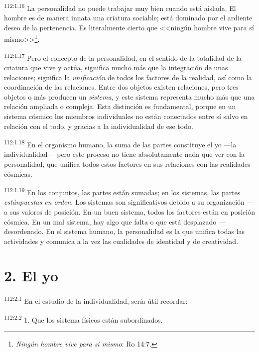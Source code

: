 \documentclass[twoside, 11pt]{book}
\begin{document}
\par
\textsuperscript{112:1.16} La personalidad no puede trabajar muy bien cuando está aislada. El hombre es de manera innata una criatura sociable; está dominado por el ardiente deseo de la pertenencia. Es literalmente cierto que <<ningún hombre vive para sí mismo>>\footnote{\textit{Ningún hombre vive para sí mismo}: Ro 14:7.}.

\par
\textsuperscript{112:1.17} Pero el concepto de la personalidad, en el sentido de la totalidad de la criatura que vive y actúa, significa mucho más que la integración de unas relaciones; significa la \textit{unificación} de todos los factores de la realidad, así como la coordinación de las relaciones. Entre dos objetos existen relaciones, pero tres objetos o más producen un \textit{sistema}, y este sistema representa mucho más que una relación ampliada o compleja. Esta distinción es fundamental, porque en un sistema cósmico los miembros individuales no están conectados entre sí salvo en relación con el todo, y gracias a la individualidad de ese todo.

\par
\textsuperscript{112:1.18} En el organismo humano, la suma de las partes constituye el yo ---la individualidad--- pero este proceso no tiene absolutamente nada que ver con la personalidad, que unifica todos estos factores en sus relaciones con las realidades cósmicas.

\par
\textsuperscript{112:1.19} En los conjuntos, las partes están sumadas; en los sistemas, las partes \textit{estánpuestas en orden}. Los sistemas son significativos debido a su organización ---a sus valores de posición. En un buen sistema, todos los factores están en posición cósmica. En un mal sistema, hay algo que falta o que está desplazado ---desordenado. En el sistema humano, la personalidad es la que unifica todas las actividades y comunica a la vez las cualidades de identidad y de creatividad.

\section*{2. El yo}
\par
\textsuperscript{112:2.1} En el estudio de la individualidad, sería útil recordar:

\par
\textsuperscript{112:2.2} 1. Que los sistema físicos están subordinados.
\end{document}
